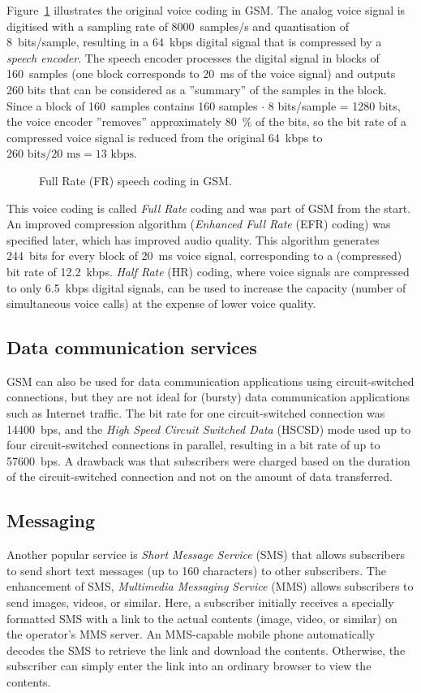 Figure~\ref{fig:gsm_voicecoding} illustrates the original voice coding in GSM. The analog voice signal is digitised with a sampling rate of 8000~samples/s and quantisation of 8~bits/sample, resulting in a 64~kbps digital signal that is compressed by a \emph{speech encoder}. The speech encoder processes the digital signal in blocks of 160~samples (one block corresponds to 20~ms of the voice signal) and outputs 260 bits that can be considered as a ''summary'' of the samples in the block. Since a block of 160~samples contains 160 samples $\cdot$ 8 bits/sample = 1280 bits, the voice encoder ''removes'' approximately 80~\% of the bits, so the bit rate of a compressed voice signal is reduced from the original 64~kbps to ${260\textrm{ bits}}/{20\textrm{ ms}}=13\textrm{ kbps}$.
\begin{figure}[htbp]
\centering
{}
\caption{\label{fig:gsm_voicecoding}Full Rate (FR) speech coding in GSM.}
\end{figure}

This voice coding is called \emph{Full Rate} coding and was part of GSM from the start. An improved compression algorithm (\emph{Enhanced Full Rate} (EFR) coding) was specified later, which has improved audio quality. This algorithm generates 244~bits for every block of 20~ms voice signal, corresponding to a (compressed) bit rate of 12.2~kbps. \emph{Half Rate} (HR) coding, where voice signals are compressed to only 6.5~kbps digital signals, can be used to increase the capacity (number of simultaneous voice calls) at the expense of lower voice quality.

\subsection{Data communication services}
GSM can also be used for data communication applications using circuit-switched connections, but they are not ideal for (bursty) data communication applications such as Internet traffic. The bit rate for one circuit-switched connection was 14400~bps, and the \emph{High Speed Circuit Switched Data} (HSCSD) mode used up to four circuit-switched connections in parallel, resulting in a bit rate of up to 57600~bps. A drawback was that subscribers were charged based on the duration of the circuit-switched connection and not on the amount of data transferred.

\subsection{Messaging}
Another popular service is \emph{Short Message Service} (SMS) that allows subscribers to send short text messages (up to 160 characters) to other subscribers. The enhancement of SMS, \ie \emph{Multimedia Messaging Service} (MMS) allows subscribers to send images, videos, or similar. Here, a subscriber initially receives a specially formatted SMS with a link to the actual contents (image, video, or similar) on the operator's MMS server. An MMS-capable mobile phone automatically decodes the SMS to retrieve the link and download the contents. Otherwise, the subscriber can simply enter the link into an ordinary browser to view the contents.

